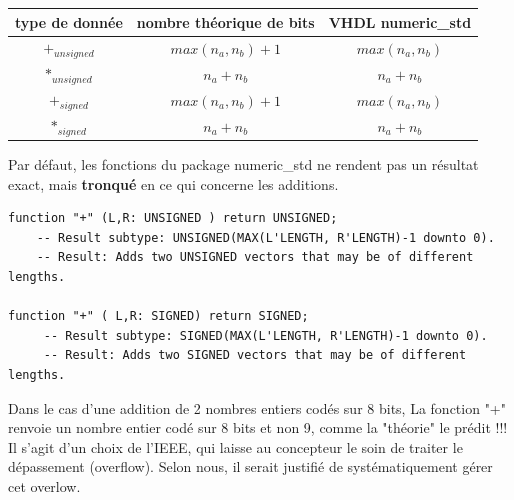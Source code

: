 \documentclass[a4paper,11pt]{article}
\begin{document}

\begin{tabular}{|c|c|c|}
  \hline
  type de donnée & nombre théorique de bits & VHDL numeric\_std \\ \hline \hline
$+_{unsigned}$ & $max(n_a,n_b)+1$ & $max(n_a,n_b)$\\ \hline %
$*_{unsigned}$ & $n_a+n_b$        & $n_a+n_b$\\ \hline      %
$+_{signed}$   & $max(n_a,n_b)+1$ & $max(n_a,n_b)$\\ \hline %
$*_{signed}$   & $n_a+n_b$        & $n_a+n_b$\\ \hline      %
\end{tabular}

Par défaut, les fonctions du package numeric\_std ne rendent pas un résultat exact, mais \textbf{tronqué} en ce qui concerne
les additions.

\begin{lstlisting}
function "+" (L,R: UNSIGNED ) return UNSIGNED;
    -- Result subtype: UNSIGNED(MAX(L'LENGTH, R'LENGTH)-1 downto 0).
    -- Result: Adds two UNSIGNED vectors that may be of different lengths.

function "+" ( L,R: SIGNED) return SIGNED;
     -- Result subtype: SIGNED(MAX(L'LENGTH, R'LENGTH)-1 downto 0).
     -- Result: Adds two SIGNED vectors that may be of different lengths.
\end{lstlisting}

Dans le cas d'une addition de 2 nombres entiers codés sur 8 bits, La fonction "+" renvoie un nombre entier codé
sur 8 bits et non 9, comme la "théorie" le prédit !!! Il s'agit d'un choix de l'IEEE, qui laisse au concepteur
le soin de traiter le dépassement (overflow). Selon nous, il serait justifié de systématiquement gérer cet overlow.
\end{document}
